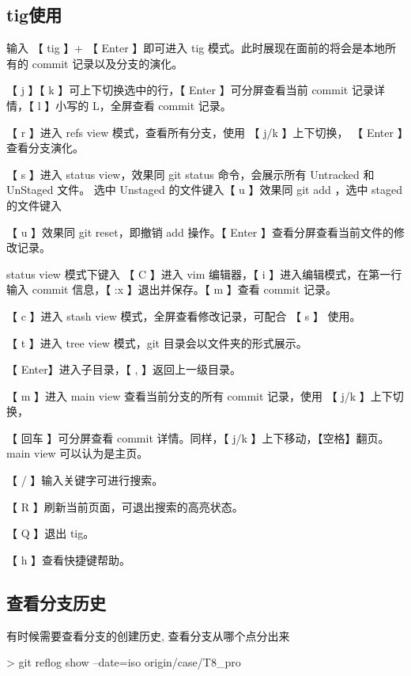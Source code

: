 \subsection{tig使用}
输入 【 tig 】+ 【 Enter 】即可进入 tig 模式。此时展现在面前的将会是本地所有的 commit 记录以及分支的演化。

【 j 】【 k 】可上下切换选中的行，【 Enter 】可分屏查看当前 commit 记录详情，【 l 】小写的 L，全屏查看 commit 记录。

【 r 】进入 refs view 模式，查看所有分支，使用 【 j/k 】上下切换， 【 Enter 】查看分支演化。

【 s 】进入 status view，效果同 git status 命令，会展示所有 Untracked 和 UnStaged 文件。 选中 Unstaged 的文件键入【 u 】效果同 git add ，选中 staged 的文件键入

【 u 】效果同 git reset，即撤销 add 操作。【 Enter 】查看分屏查看当前文件的修改记录。

status view 模式下键入 【 C 】进入 vim 编辑器，【 i 】进入编辑模式，在第一行输入 commit 信息，【 :x 】退出并保存。【 m 】查看 commit 记录。

【 c 】进入 stash view 模式，全屏查看修改记录，可配合 【 s 】 使用。

【 t 】进入 tree view 模式，git 目录会以文件夹的形式展示。

【 Enter】进入子目录，【 , 】返回上一级目录。

【 m 】进入 main view 查看当前分支的所有 commit 记录，使用 【 j/k 】上下切换，

【 回车 】可分屏查看 commit 详情。同样，【 j/k 】上下移动，【空格】翻页。
main view 可以认为是主页。

【 / 】输入关键字可进行搜索。

【 R 】刷新当前页面，可退出搜索的高亮状态。

【 Q 】退出 tig。

【 h 】查看快捷键帮助。

\subsection{查看分支历史}
有时候需要查看分支的创建历史, 查看分支从哪个点分出来
\begin{commandbox}
 >  git reflog show --date=iso origin/case/T8_pro
\end{commandbox}

